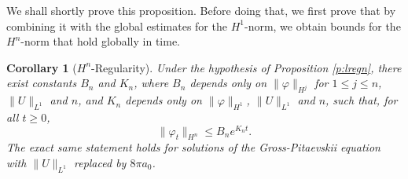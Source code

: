 \documentclass[11pt,a4paper,DIV11]{scrartcl}	%
\newtheorem{cor}[thm]{Corollary}
\begin{document}
We shall shortly prove this proposition. Before doing that, we first prove
that by combining it with the global estimates for the $H^1$-norm, we obtain
bounds for the $H^n$-norm that hold globally in time.


\begin{cor}[$H^n$-Regularity] \label{c:regn}
  Under the hypothesis of Proposition \ref{p:lregn}, there exist constants
  $B_n$ and $K_n$, where $B_n$ depends only on $\| \varphi \|_{H^j}$ for $1
  \le j \le n$, $\| U \|_{L^1}$ and $n$, and $K_n$ depends only on $\|
  \varphi \|_{H^1}$, $\| U \|_{L^1}$ and $n$, such that, for all $t \ge 0$,
  \[
    \| \varphi_t \|_{H^n} \le B_n e^{K_n t}.
  \]
  The exact same statement holds for solutions of the Gross-Pitaevskii
  equation with $\| U \|_{L^1}$ replaced by $8 \pi a_0$.
\end{cor}
\end{document}
